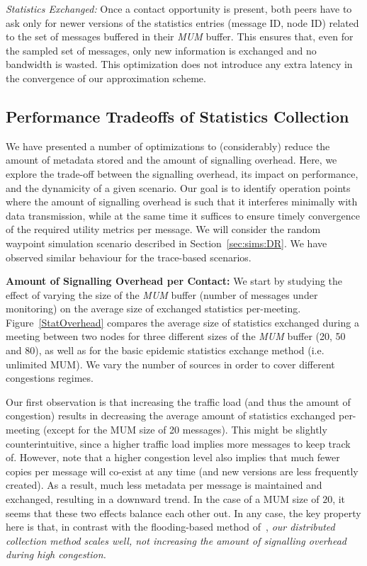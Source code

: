 \emph{Statistics Exchanged:} Once a contact opportunity is present, both peers have to ask only for newer versions of the statistics entries (message ID, node ID) related to the set of messages buffered in their \emph{MUM} buffer. This ensures that, even for the sampled set of messages, only new information is exchanged and no bandwidth is wasted. This optimization does not introduce any extra latency in the convergence of our approximation scheme.

\subsection{Performance Tradeoffs of Statistics Collection}
\label{PENHCM}

We have presented a number of optimizations to (considerably) reduce the amount of metadata stored and the amount of signalling overhead. Here, we explore the trade-off between the signalling overhead, its impact on performance, and the dynamicity of a given scenario. Our goal is to identify operation points where the amount of signalling overhead is such that it interferes minimally with data transmission, while at the same time it suffices to ensure timely convergence of the required utility metrics per message. We will consider the random waypoint simulation scenario described in Section~\ref{sec:sims:DR}. We have observed similar behaviour for the trace-based scenarios.

\textbf{Amount of Signalling Overhead per Contact:} We start by studying the effect of varying the size of the \emph{MUM} buffer (number of messages under monitoring) on the average size of exchanged statistics per-meeting. Figure~\ref{StatOverhead} compares the average size of statistics exchanged during a meeting between two nodes for three different sizes of the \emph{MUM} buffer (20, 50 and 80), as well as for the basic epidemic statistics exchange method (i.e. unlimited MUM). We vary the number of sources in order to cover different congestions regimes.

Our first observation is that increasing the traffic load (and thus the amount of congestion) results in decreasing the average amount of statistics exchanged per-meeting (except for the MUM size of 20 messages). This might be slightly counterintuitive, since a higher traffic load implies more messages to keep track of. However, note that a higher congestion level also implies that much fewer copies per message will co-exist at any time (and new versions are less frequently created). As a result, much less metadata per message is maintained and exchanged, resulting in a downward trend. In the case of a MUM size of $20$, it seems that these two effects balance each other out. In any case, the key property here is that, in contrast with the flooding-based method of~\cite{Levine:Sigcomm07}, \emph{our distributed collection method scales well, not increasing the amount of signalling overhead during high congestion.}

